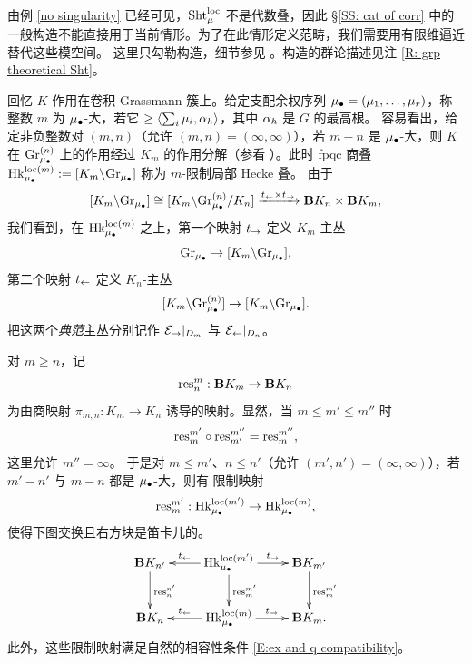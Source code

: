 由例 \ref{no singularity} 已经可见，$\operatorname{Sht}^{\mathrm{loc}}_\mu$ 不是代数叠，因此 \S \ref{SS: cat of corr} 中的一般构造不能直接用于当前情形。为了在此情形定义范畴，我们需要用有限维逼近替代这些模空间。
这里只勾勒构造，细节参见 \cite[\S 5]{XZ}。构造的群论描述见注 \ref{R: grp theoretical Sht}。

回忆 $K$ 作用在卷积 Grassmann 簇上。给定支配余权序列 ${\mu_\bullet}=(\mu_1,\ldots,\mu_r)$，称整数 $m$ 为 ${\mu_\bullet}$-大，若它 $\geq \langle\sum_i\mu_i,{\alpha}_h\rangle$，其中 ${\alpha}_h$ 是 $G$ 的最高根。
容易看出，给定非负整数对 $(m,n)$（允许 $(m,n)=(\infty,\infty)$），若 $m-n$ 是 ${\mu_\bullet}$-大，则 $K$ 在 ${\operatorname{Gr}}_{\mu_\bullet}^{(n)}$ 上的作用经过 $K_{m}$ 的作用分解（参看 \cite[引理 3.1.7]{XZ}）。此时 fpqc 商叠
${\operatorname{Hk}}^{\mathrm{loc}(m)}_{\mu_\bullet}:=[K_m\backslash {\operatorname{Gr}}_{\mu_\bullet}]$ 称为 $m$-限制局部 Hecke 叠。
由于
\[
[K_m\backslash{\operatorname{Gr}}_{\mu_\bullet}]\cong [K_m\backslash{\operatorname{Gr}}^{(n)}_{\mu_\bullet}/K_n]\xrightarrow{t_\leftarrow\times t_\to} {\mathbf{B}} K_n\times {\mathbf{B}} K_m,
\]
我们看到，在 ${\operatorname{Hk}}_{{\mu_\bullet}}^{\mathrm{loc}(m)}$ 之上，第一个映射 $t_\to$ 定义 $K_m$-主丛
\begin{equation*}\label{torsor2}
{\operatorname{Gr}}_{\mu_\bullet} \to [K_m\backslash{\operatorname{Gr}}_{\mu_\bullet}],
\end{equation*}
第二个映射 $t_\leftarrow$ 定义 $K_n$-主丛
\begin{equation*}\label{torsor1}
[K_m\backslash{\operatorname{Gr}}_{{\mu_\bullet}}^{(n)}]\to  [K_m\backslash{\operatorname{Gr}}_{\mu_\bullet}].
\end{equation*}
把这两个\emph{典范}主丛分别记作 $\mathcal{E}_{\to}|_{D_{m}}$ 与 $\mathcal{E}_{\leftarrow}|_{D_n}$。

对 $m\geq n$，记
$${\operatorname{res}}^m_n: {\mathbf{B}} K_m\to {\mathbf{B}} K_n$$
为由商映射 $\pi_{m,n}:K_m\to K_n$ 诱导的映射。显然，当 $m\leq m'\leq m''$ 时
\begin{equation}
\label{E:ex and q compatibility}
{\operatorname{res}}_{m}^{m'} \circ {\operatorname{res}}_{m'}^{m''} = {\operatorname{res}}_{m}^{m''},
\end{equation}
这里允许 $m''=\infty$。
于是对 $m\leq m'$、$n\leq n'$（允许 $(m',n')=(\infty,\infty)$），若 $m'-n'$ 与 $m-n$ 都是 ${\mu_\bullet}$-大，则有
限制映射
$${\operatorname{res}}^{m'}_m: {\operatorname{Hk}}^{\mathrm{loc}(m')}_{{\mu_\bullet}}\to {\operatorname{Hk}}^{\mathrm{loc}(m)}_{{\mu_\bullet}},$$ 使得下图交换且右方块是笛卡儿的。
\begin{equation*}
\label{E:restriction and torsor commutative}
\xymatrix{
\bfB K_{n'} \ar[d]^{\res^{n'}_n} &
\Hk_\mmu^{\loc(m')} \ar[l]_-{t_\leftone} \ar[r]^-{t_\rightone} \ar[d]^{\res^{m'}_{m}} &  \bfB K_{m'} \ar[d]^{\res^{m'}_{m}}
\\
\bfB K_n & \Hk_\mmu^{\loc(m)} \ar[l]_-{t_\leftone} \ar[r]^-{t_\rightone} &  \bfB K_m.
}
\end{equation*}
此外，这些限制映射满足自然的相容性条件 \eqref{E:ex and q compatibility}。

